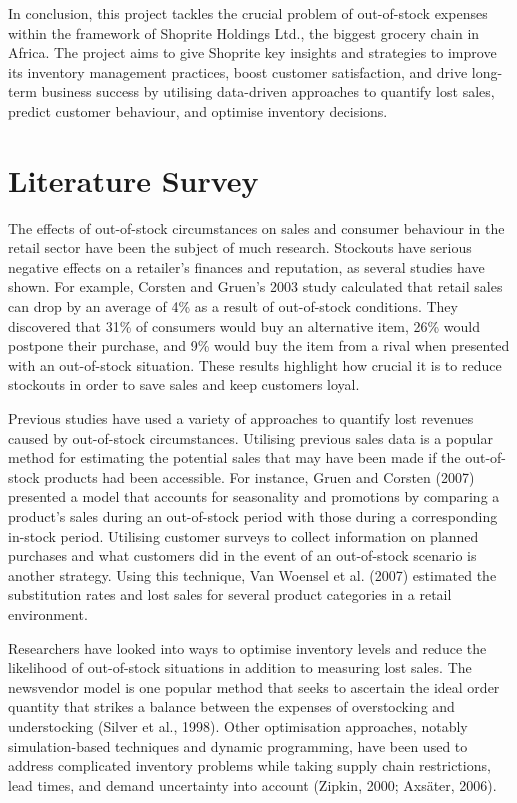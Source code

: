 \documentclass{article}
\begin{document}
In conclusion, this project tackles the crucial problem of out-of-stock expenses within the framework of Shoprite Holdings Ltd., the biggest grocery chain in Africa. The project aims to give Shoprite key insights and strategies to improve its inventory management practices, boost customer satisfaction, and drive long-term business success by utilising data-driven approaches to quantify lost sales, predict customer behaviour, and optimise inventory decisions.

\section{Literature Survey}

The effects of out-of-stock circumstances on sales and consumer behaviour in the retail sector have been the subject of much research. Stockouts have serious negative effects on a retailer's finances and reputation, as several studies have shown. For example, Corsten and Gruen's 2003 study calculated that retail sales can drop by an average of 4\% as a result of out-of-stock conditions. They discovered that 31\% of consumers would buy an alternative item, 26\% would postpone their purchase, and 9\% would buy the item from a rival when presented with an out-of-stock situation. These results highlight how crucial it is to reduce stockouts in order to save sales and keep customers loyal.

Previous studies have used a variety of approaches to quantify lost revenues caused by out-of-stock circumstances. Utilising previous sales data is a popular method for estimating the potential sales that may have been made if the out-of-stock products had been accessible. For instance, Gruen and Corsten (2007) presented a model that accounts for seasonality and promotions by comparing a product's sales during an out-of-stock period with those during a corresponding in-stock period. Utilising customer surveys to collect information on planned purchases and what customers did in the event of an out-of-stock scenario is another strategy. Using this technique, Van Woensel et al. (2007) estimated the substitution rates and lost sales for several product categories in a retail environment.

Researchers have looked into ways to optimise inventory levels and reduce the likelihood of out-of-stock situations in addition to measuring lost sales. The newsvendor model is one popular method that seeks to ascertain the ideal order quantity that strikes a balance between the expenses of overstocking and understocking (Silver et al., 1998). Other optimisation approaches, notably simulation-based techniques and dynamic programming, have been used to address complicated inventory problems while taking supply chain restrictions, lead times, and demand uncertainty into account (Zipkin, 2000; Axsäter, 2006).
\end{document}
